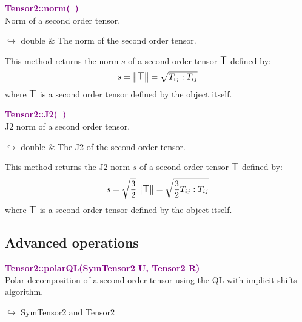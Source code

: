 \textcolor{purple}{\textbf{Tensor2::norm(~)}}\label{Tensor2::norm()}\\
Norm of a second order tensor.\vspace*{-0.5em}
\begin{tcolorbox}[grow to left by=-1cm, width=\textwidth-1cm,myArgs,tabularx={l|R}]
$\hookrightarrow$ double & The norm of the second order tensor.
\end{tcolorbox}

This method returns the norm $s$ of a second order tensor $\mbox{\large\ensuremath{\mathsf{T}}}$ defined by:\begin{equation*}
s = \left\Vert \mbox{\large\ensuremath{\mathsf{T}}} \right\Vert  = \sqrt {T_{ij}:T_{ij}}
\end{equation*}
where $\mbox{\large\ensuremath{\mathsf{T}}}$ is a second order tensor defined by the object itself.

\textcolor{purple}{\textbf{Tensor2::J2(~)}}\label{Tensor2::J2()}\\
J2 norm of a second order tensor.\vspace*{-0.5em}
\begin{tcolorbox}[grow to left by=-1cm, width=\textwidth-1cm,myArgs,tabularx={l|R}]
$\hookrightarrow$ double & The J2 of the second order tensor.
\end{tcolorbox}

This method returns the J2 norm $s$ of a second order tensor $\mbox{\large\ensuremath{\mathsf{T}}}$ defined by:
\begin{equation*}
s = \sqrt {\frac{3}{2}} \left\Vert \mbox{\large\ensuremath{\mathsf{T}}} \right\Vert  = \sqrt {\frac{3}{2} T_{ij}:T_{ij}}
\end{equation*}
where $\mbox{\large\ensuremath{\mathsf{T}}}$ is a second order tensor defined by the object itself.

\subsection{Advanced operations}

\textcolor{purple}{\textbf{Tensor2::polarQL(SymTensor2 U, Tensor2 R)}}\label{Tensor2::polarQL(SymTensor2 U, Tensor2 R)}\\
Polar decomposition of a second order tensor using the QL with implicit shifts algorithm.\vspace*{-0.5em}
\begin{tcolorbox}[grow to left by=-1cm, width=\textwidth-1cm,myArgs,tabularx={l|R}]
$\hookrightarrow$ SymTensor2 and Tensor2
\end{tcolorbox}

